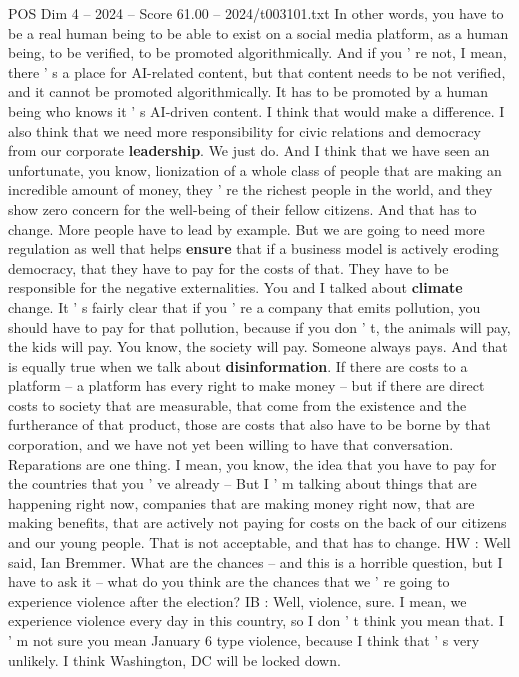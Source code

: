 \begin{textsample}{POS Dim 4 – 2024 – Score 61.00 – 2024/t003101.txt}
In other words, you have to be a real human being to be able to exist on a social media platform, as a human being, to be verified, to be promoted algorithmically.
And if you ' re not, I mean, there ' s a place for AI-related content, but that content needs to be not verified, and it cannot be promoted algorithmically.
It has to be promoted by a human being who knows it ' s AI-driven content.
I think that would make a difference.
I also think that we need more responsibility for civic relations and democracy from our corporate \textbf{leadership}.
We just do.
And I think that we have seen an unfortunate, you know, lionization of a whole class of people that are making an incredible amount of money, they ' re the richest people in the world, and they show zero concern for the well-being of their fellow citizens.
And that has to change.
More people have to lead by example.
But we are going to need more regulation as well that helps \textbf{ensure} that if a business model is actively eroding democracy, that they have to pay for the costs of that.
They have to be responsible for the negative externalities.
You and I talked about \textbf{climate} change.
It ' s fairly clear that if you ' re a company that emits pollution, you should have to pay for that pollution, because if you don ' t, the animals will pay, the kids will pay.
You know, the society will pay.
Someone always pays.
And that is equally true when we talk about \textbf{disinformation}.
If there are costs to a platform -- a platform has every right to make money -- but if there are direct costs to society that are measurable, that come from the existence and the furtherance of that product, those are costs that also have to be borne by that corporation, and we have not yet been willing to have that conversation.
Reparations are one thing.
I mean, you know, the idea that you have to pay for the countries that you ' ve already -- But I ' m talking about things that are happening right now, companies that are making money right now, that are making benefits, that are actively not paying for costs on the back of our citizens and our young people.
That is not acceptable, and that has to change.
HW : Well said, Ian Bremmer.
What are the chances -- and this is a horrible question, but I have to ask it -- what do you think are the chances that we ' re going to experience violence after the election?
IB : Well, violence, sure.
I mean, we experience violence every day in this country, so I don ' t think you mean that.
I ' m not sure you mean January 6 type violence, because I think that ' s very unlikely.
I think Washington, DC will be locked down.

\end{textsample}

